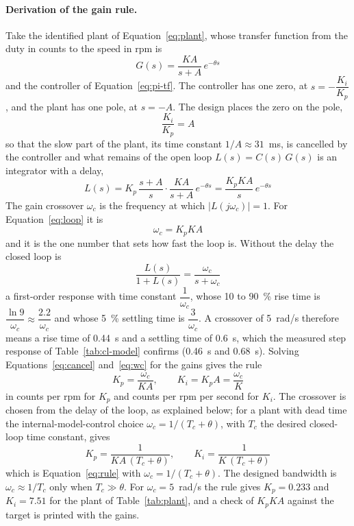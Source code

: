 \paragraph{Derivation of the gain rule.}
Take the identified plant of Equation~\ref{eq:plant}, whose transfer function from the duty in counts to the speed in rpm is
\begin{equation}
    G(s) = \frac{K A}{s + A}\, e^{-\theta s}
    \label{eq:plant-tf}
\end{equation}
and the controller of Equation~\ref{eq:pi-tf}. The controller has one zero, at $s = -\dfrac{K_i}{K_p}$, and the plant has one pole, at $s = -A$. The design places the zero on the pole,
\begin{equation}
    \frac{K_i}{K_p} = A
    \label{eq:cancel}
\end{equation}
so that the slow part of the plant, its time constant $1/A \approx 31$~ms, is cancelled by the controller and what remains of the open loop $L(s) = C(s)\,G(s)$ is an integrator with a delay,
\begin{equation}
    L(s) = K_p\,\frac{s + A}{s}\cdot\frac{K A}{s + A}\, e^{-\theta s} = \frac{K_p K A}{s}\, e^{-\theta s}
    \label{eq:loop}
\end{equation}
The gain crossover $\omega_c$ is the frequency at which $|L(j\omega_c)| = 1$. For Equation~\ref{eq:loop} it is
\begin{equation}
    \omega_c = K_p K A
    \label{eq:wc}
\end{equation}
and it is the one number that sets how fast the loop is. Without the delay the closed loop is
\begin{equation}
    \frac{L(s)}{1 + L(s)} = \frac{\omega_c}{s + \omega_c}
    \label{eq:cl-first}
\end{equation}
a first-order response with time constant $\dfrac{1}{\omega_c}$, whose 10 to 90~\% rise time is $\dfrac{\ln 9}{\omega_c} \approx \dfrac{2.2}{\omega_c}$ and whose 5~\% settling time is $\dfrac{3}{\omega_c}$. A crossover of 5~rad/s therefore means a rise time of 0.44~s and a settling time of 0.6~s, which the measured step response of Table~\ref{tab:cl-model} confirms (0.46~s and 0.68~s). Solving Equations~\ref{eq:cancel} and~\ref{eq:wc} for the gains gives the rule
\begin{equation}
    K_p = \frac{\omega_c}{K A}, \qquad K_i = K_p A = \frac{\omega_c}{K}
    \label{eq:rule}
\end{equation}
in counts per rpm for $K_p$ and counts per rpm per second for $K_i$. The crossover is chosen from the delay of the loop, as explained below; for a plant with dead time the internal-model-control choice $\omega_c = 1/(T_c + \theta)$, with $T_c$ the desired closed-loop time constant, gives
\begin{equation}
    K_p = \frac{1}{K A\,(T_c + \theta)}, \qquad K_i = \frac{1}{K\,(T_c + \theta)}
    \label{eq:imc}
\end{equation}
which is Equation~\ref{eq:rule} with $\omega_c = 1/(T_c + \theta)$. The designed bandwidth is $\omega_c \approx 1/T_c$ only when $T_c \gg \theta$. For $\omega_c = 5$~rad/s the rule gives $K_p = 0.233$ and $K_i = 7.51$ for the plant of Table~\ref{tab:plant}, and a check of $K_p K A$ against the target is printed with the gains.

